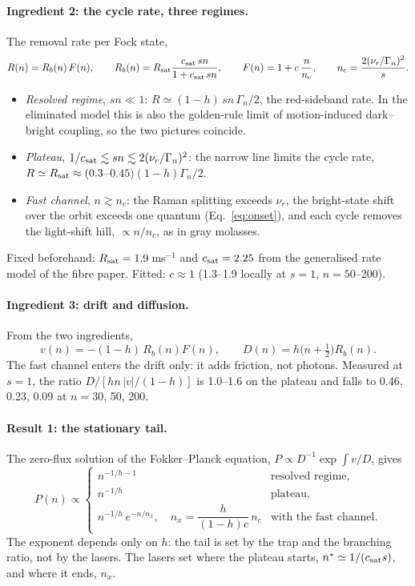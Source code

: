 \documentclass[11pt,a4paper]{article}
\newcommand{\nur}{\nu_r}
\begin{document}
\paragraph{Ingredient 2: the cycle rate, three regimes.} The removal rate per Fock state,
\begin{equation}
  R(n)=R_b(n)\,F(n),\qquad R_b(n)=R_{\rm sat}\frac{c_{\rm sat}\,sn}{1+c_{\rm sat}\,sn},\qquad F(n)=1+c\,\frac{n}{n_c},\qquad n_c=\frac{2(\nur/\Gamma_n)^2}{s}.
  \label{eq:min_R}
\end{equation}
\begin{itemize}
\item \emph{Resolved regime}, $sn\ll1$: $R\simeq(1-h)\,sn\,\Gamma_n/2$, the red-sideband rate. In the eliminated model this is also the golden-rule limit of motion-induced dark--bright coupling, so the two pictures coincide.
\item \emph{Plateau}, $1/c_{\rm sat}\lesssim sn\lesssim2(\nur/\Gamma_n)^2$: the narrow line limits the cycle rate, $R\simeq R_{\rm sat}\approx(0.3$--$0.45)(1-h)\Gamma_n/2$.
\item \emph{Fast channel}, $n\gtrsim n_c$: the Raman splitting exceeds $\nur$, the bright-state shift over the orbit exceeds one quantum (Eq.~\eqref{eq:onset}), and each cycle removes the light-shift hill, $\propto n/n_c$, as in gray molasses.
\end{itemize}
Fixed beforehand: $R_{\rm sat}=1.9\,$ms$^{-1}$ and $c_{\rm sat}=2.25$ from the generalised rate model of the fibre paper. Fitted: $c\approx1$ (1.3--1.9 locally at $s=1$, $n=50$--200).

\paragraph{Ingredient 3: drift and diffusion.} From the two ingredients,
\begin{equation}
  v(n)=-(1-h)\,R_b(n)F(n),\qquad D(n)=h\big(n+\tfrac12\big)R_b(n).
  \label{eq:min_vD}
\end{equation}
The fast channel enters the drift only: it adds friction, not photons. Measured at $s=1$, the ratio $D/[hn\,|v|/(1-h)]$ is 1.0--1.6 on the plateau and falls to 0.46, 0.23, 0.09 at $n=30$, 50, 200.

\paragraph{Result 1: the stationary tail.} The zero-flux solution of the Fokker--Planck equation, $P\propto D^{-1}\exp\int v/D$, gives
\begin{equation}
  P(n)\propto
  \begin{cases}
    n^{-1/h-1} & \text{resolved regime},\\
    n^{-1/h} & \text{plateau},\\
    n^{-1/h}\,e^{-n/n_x},\quad n_x=\dfrac{h}{(1-h)c}\,n_c & \text{with the fast channel}.
  \end{cases}
  \label{eq:min_tail}
\end{equation}
The exponent depends only on $h$: the tail is set by the trap and the branching ratio, not by the lasers. The lasers set where the plateau starts, $n^*\simeq1/(c_{\rm sat}s)$, and where it ends, $n_x$.
\end{document}
